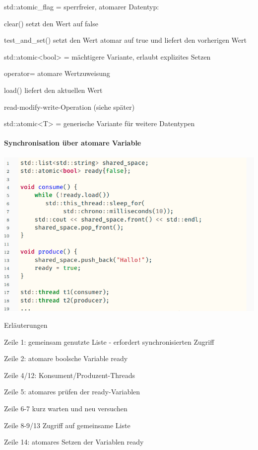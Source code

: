 \documentclass[10pt]{article}
\begin{document}
  \begin{itemize*}
    \item std::atomic\_flag = sperrfreier, atomarer Datentyp:
    \begin{itemize*}
      \item clear() setzt den Wert auf false
      \item test\_and\_set() setzt den Wert atomar auf true und liefert den vorherigen Wert
    \end{itemize*}
    \item std::atomic<bool> = mächtigere Variante, erlaubt explizites Setzen
    \begin{itemize*}
      \item operator= atomare Wertzuweisung
      \item load() liefert den aktuellen Wert
      \item read-modify-write-Operation (siehe später)
    \end{itemize*}
    \item std::atomic<T> = generische Variante für weitere Datentypen
  \end{itemize*}
  
  
  \paragraph{Synchronisation über atomare Variable}
  
  \begin{center}
    \includegraphics[width=0.4\linewidth]{Assets/Programmierparadigmen-code-snippet-24}
  \end{center}
  Erläuterungen
  \begin{itemize*}
    \item Zeile 1: gemeinsam genutzte Liste - erfordert synchronisierten Zugriff
    \item Zeile 2: atomare boolsche Variable ready
    \item Zeile 4/12: Konsument/Produzent-Threads
    \item Zeile 5: atomares prüfen der ready-Variablen
    \item Zeile 6-7 kurz warten und neu versuchen
    \item Zeile 8-9/13 Zugriff auf gemeinsame Liste
    \item Zeile 14: atomares Setzen der Variablen ready
  \end{itemize*}
  
\end{document}
